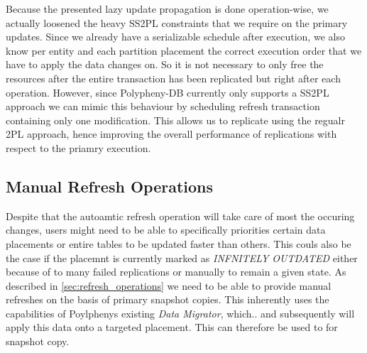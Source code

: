 Because the presented lazy update propagation is done operation-wise, we actually loosened the heavy SS2PL constraints that we require on the primary updates. 
Since we already have a serializable schedule after execution, we also know per entity and each partition placement 
the correct execution order that we have to apply the data changes on. So it is not necessary to only free the resources 
after the entire transaction has been replicated but right after each operation. 
However, since Polypheny-DB currently only supports a SS2PL approach we can 
mimic this behaviour by scheduling refresh transaction containing only one modification.
This allows us to replicate using the regualr 2PL approach, hence improving the overall performance of replications with respect to the priamry execution.









\subsection{Manual Refresh Operations}
Despite that the autoamtic refresh operation will take care of most the occuring changes, users might need to be able to specifically priorities certain data placements 
or entire tables to be updated faster than others. This couls also be the case if the placemnt is currently marked as \emph{INFNITELY OUTDATED}
either because of to many failed replications or manually to remain a given state. 
As described in \ref{sec:refresh_operations} we need to be able to provide manual refreshes on the basis of primary snapshot copies.
This inherently uses the capabilities of Poylphenys existing \emph{Data Migrator}, which..
and subsequently will apply this data onto a targeted placement.
This can therefore be used to for snapshot copy.


